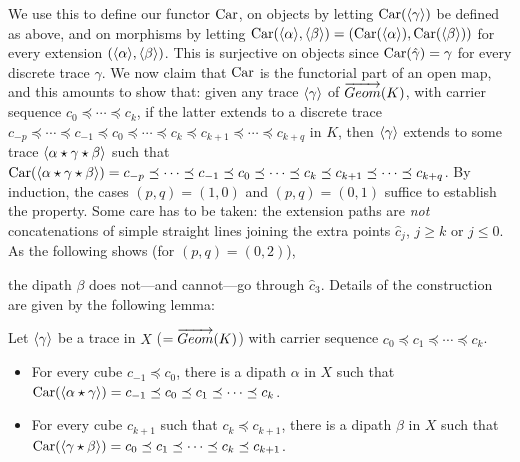   We use this to define our functor $\text{Car}$, on objects by
  letting $\text{Car}(\langle\gamma\rangle)$ be defined as above, 
  and on morphisms by letting $\text{Car}(\langle\alpha\rangle,\langle\beta\rangle) = (\text{Car}(\langle\alpha\rangle),\text{Car}(\langle\beta\rangle))$ for every extension
  $(\langle\alpha\rangle,\langle\beta\rangle)$.  This
  is surjective on objects since $\text{Car} (\hat \gamma) = \gamma$ for every
  discrete trace $\gamma$.  We now claim that $\text{Car}$ is the functorial part of an open map, and this
  amounts to show that: given any trace $\langle\gamma\rangle$ of
  $\overrightarrow{Geom}(K)$, with carrier sequence $c_0 \preceq \cdots \preceq c_k$, if the
    latter extends to a discrete trace $c_{-p} \preceq \cdots \preceq
    c_{-1} \preceq c_0 \preceq \cdots \preceq c_k \preceq c_{k+1}
    \preceq \cdots \preceq c_{k+q}$ in $K$, then $\langle\gamma\rangle$
    extends to some trace $\langle\alpha \star \gamma \star \beta\rangle$ such that $\text{Car}(\langle\alpha \star \gamma \star \beta\rangle) =
    c_{-p} \preceq \cdots \preceq c_{-1} \preceq c_0 \preceq \cdots
    \preceq c_k \preceq c_{k+1} \preceq \cdots \preceq c_{k+q}$.  By
    induction, the cases $(p,q)=(1,0)$ and $(p,q)=(0,1)$ suffice to
    establish the property.  Some care has to be taken: the extension
    paths are \emph{not} concatenations of simple straight lines
    joining the extra points $\hat c_j$, $j \geq k$ or $j\leq 0$.  As
    the following shows (for $(p,q)=(0,2)$),
    
    \begin{figure}[H]
  \centering
    		
\end{figure}
   \noindent the dipath
    $\beta$ does not---and cannot---go through $\hat c_3$. 
    Details of the construction are given by the following lemma:
    
    \begin{lemme}
  \label{lemma:bisim:C}
  Let $\langle\gamma\rangle$ be a trace in $X$ ($=\overrightarrow{Geom}(K)$) with
  carrier sequence $c_0 \preceq c_1 \preceq \cdots \preceq c_k$.
  \begin{itemize}
  \item For every cube $c_{-1} \preceq c_0$, there is a dipath
    $\alpha$ in $X$ such that
    $\text{Car}(\langle\alpha\star\gamma\rangle) = c_{-1} \preceq c_0
    \preceq c_1 \preceq \cdots \preceq c_k$.
  \item For every cube $c_{k+1}$ such that $c_k \preceq c_{k+1}$,
    there is a dipath $\beta$ in $X$ such that $\text{Car}(\langle
    \gamma \star \beta\rangle) = c_0 \preceq c_1 \preceq \cdots \preceq
    c_k \preceq c_{k+1}$.
  \end{itemize}
\end{lemme}


